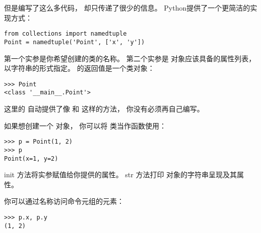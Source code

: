
但是编写了这么多代码， 却只传递了很少的信息。  
Python提供了一个更简洁的实现方式：

\begin{lstlisting}
from collections import namedtuple
Point = namedtuple('Point', ['x', 'y'])
\end{lstlisting}


第一个实参是你希望创建的类的名称。 第二个实参是  对象应该具备的属性列表， 以字符串的形式指定。   的返回值是一个类对象：

\begin{lstlisting}
>>> Point
<class '__main__.Point'>
\end{lstlisting}


这里的  自动提供了像  和  这样的方法， 你没有必须再自己编写。


如果想创建一个  对象， 你可以将  类当作函数使用：

\begin{lstlisting}
>>> p = Point(1, 2)
>>> p
Point(x=1, y=2)
\end{lstlisting}


init 方法将实参赋值给你提供的属性。  
str 方法打印  对象的字符串呈现及其属性。


你可以通过名称访问命令元组的元素：

\begin{lstlisting}
>>> p.x, p.y
(1, 2)
\end{lstlisting}

